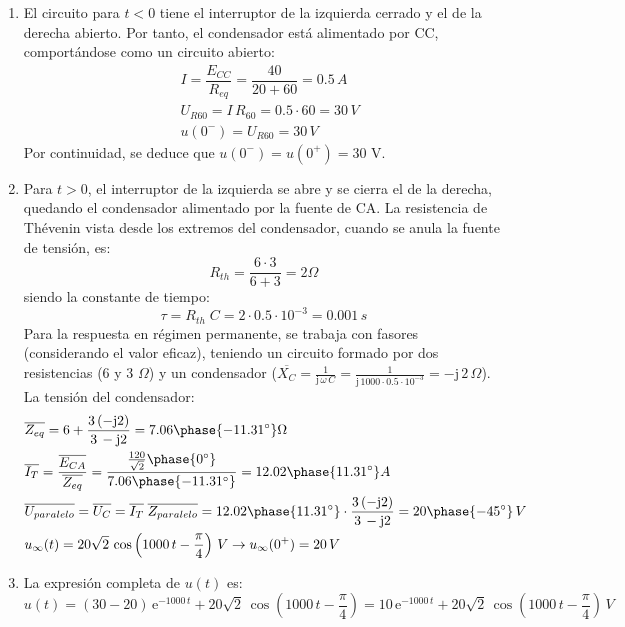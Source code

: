 \begin{enumerate}
    \item El circuito para $t<0$ tiene el interruptor de la izquierda cerrado y el de la derecha abierto. Por tanto, el condensador está alimentado por CC, comportándose como un circuito abierto:
    \begin{align*}
        &I=\dfrac{E_{CC}}{R_{eq}}=\dfrac{40}{20+60}=0.5\,A\\
        &U_{R60}=I\,R_{60}=0.5\cdot 60=30\,V\\
        &u(0^-)=U_{R60}=30\,V
    \end{align*}
    Por continuidad, se deduce que $u(0^-)=u(0^+)=30$ V.
    \item Para $t>0$, el interruptor de la izquierda se abre y se cierra el de la derecha, quedando el condensador alimentado por la fuente de CA. 
    La resistencia de Thévenin vista desde los extremos del condensador, cuando se anula la fuente de tensión, es:
    \begin{equation*}
        R_{th}=\dfrac{6\cdot 3}{6+3}=2\Omega
    \end{equation*}
    siendo la constante de tiempo:
    \begin{equation*}
        \tau=R_{th}\;C=2\cdot0.5\cdot10^{-3}=0.001\,s
    \end{equation*}
    Para la respuesta en régimen permanente, se trabaja con fasores (considerando el valor eficaz), teniendo un circuito formado por dos resistencias (6 y 3 $\Omega$) y un condensador ($\overline{X_C}=\frac{1}{\mathrm{j}\,\omega\,C}=\frac{1}{\mathrm{j}\,1000\cdot 0.5\cdot 10^{-3}}=-\mathrm{j}\,2\,\Omega$). La tensión del condensador:
    \begin{align*}
        &\overline{Z_{eq}}=6+\dfrac{3\,(-\mathrm{j}2)}{3\,-\mathrm{j}2}=7.06\phase{-11.31^\circ}\Omega\\
        &\overline{I_T}=\dfrac{\overline{E_{CA}}}{\overline{Z_{eq}}}=\dfrac{\frac{120}{\sqrt{2}}\phase{0^\circ}}{7.06\phase{-11.31^\circ}}=12.02\phase{11.31^\circ} A\\
        &\overline{U_{paralelo}}=\overline{U_C}=\overline{I_T}\;\overline{Z_{paralelo}}=12.02\phase{11.31^\circ}\cdot \dfrac{3\,(-\mathrm{j}2)}{3\,-\mathrm{j}2}=20\phase{-45^\circ}\,V\\
        &u_\infty(t)=20\sqrt{2}\,\cos\left(1000\,t-\frac{\pi}{4}\right)\,V \rightarrow u_\infty(0^+)=20\,V
    \end{align*}
    \item La expresión completa de $u(t)$ es:
    \begin{equation*}
        u(t)=\left(30-20 \right)\,\mathrm{e}^{-1000\,t}+20\sqrt{2}\,\cos\left(1000\,t-\frac{\pi}{4}\right)=10\,\mathrm{e}^{-1000\,t}+20\sqrt{2}\,\cos\left(1000\,t-\frac{\pi}{4}\right)\,V
    \end{equation*}
\end{enumerate}


